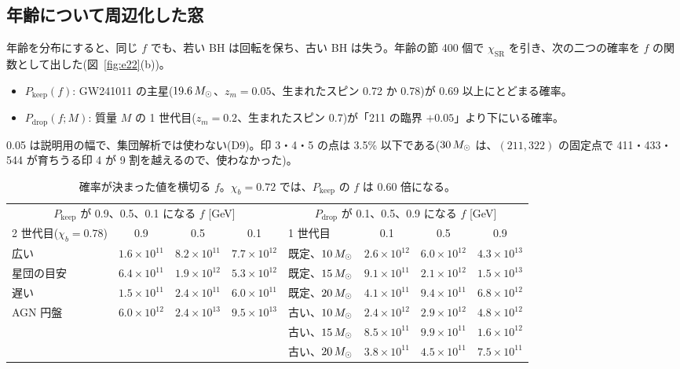 \subsection{年齢について周辺化した窓}

年齢を分布にすると、同じ $f$ でも、若い BH は回転を保ち、古い BH は失う。年齢の節 400 個で $\chi_\mathrm{SR}$ を引き、次の二つの確率を $f$ の関数として出した(図~\ref{fig:e22}(b))。
\begin{itemize}
\item $P_\mathrm{keep}(f)$: GW241011 の主星($19.6\,M_\odot$、$z_m=0.05$、生まれたスピン 0.72 か 0.78)が 0.69 以上にとどまる確率。
\item $P_\mathrm{drop}(f;M)$: 質量 $M$ の 1 世代目($z_m=0.2$、生まれたスピン 0.7)が「211 の臨界 $+0.05$」より下にいる確率。
\end{itemize}
0.05 は説明用の幅で、集団解析では使わない(D9)。印 3・4・5 の点は 3.5\% 以下である($30\,M_\odot$ は、$(211,322)$ の固定点で 411・433・544 が育ちうる印 4 が 9 割を越えるので、使わなかった)。

\begin{table}[H]
\centering\footnotesize
\begin{tabular}{lccc@{\qquad}lccc}
\toprule
\multicolumn{4}{c}{$P_\mathrm{keep}$ が 0.9、0.5、0.1 になる $f$ [GeV]} & \multicolumn{4}{c}{$P_\mathrm{drop}$ が 0.1、0.5、0.9 になる $f$ [GeV]}\\
2 世代目($\chi_b=0.78$) & 0.9 & 0.5 & 0.1 & 1 世代目 & 0.1 & 0.5 & 0.9\\
\midrule
広い & $1.6\times10^{11}$ & $8.2\times10^{11}$ & $7.7\times10^{12}$ & 既定、$10\,M_\odot$ & $2.6\times10^{12}$ & $6.0\times10^{12}$ & $4.3\times10^{13}$\\
星団の目安 & $6.4\times10^{11}$ & $1.9\times10^{12}$ & $5.3\times10^{12}$ & 既定、$15\,M_\odot$ & $9.1\times10^{11}$ & $2.1\times10^{12}$ & $1.5\times10^{13}$\\
遅い & $1.5\times10^{11}$ & $2.4\times10^{11}$ & $6.0\times10^{11}$ & 既定、$20\,M_\odot$ & $4.1\times10^{11}$ & $9.4\times10^{11}$ & $6.8\times10^{12}$\\
AGN 円盤 & $6.0\times10^{12}$ & $2.4\times10^{13}$ & $9.5\times10^{13}$ & 古い、$10\,M_\odot$ & $2.4\times10^{12}$ & $2.9\times10^{12}$ & $4.8\times10^{12}$\\
 & & & & 古い、$15\,M_\odot$ & $8.5\times10^{11}$ & $9.9\times10^{11}$ & $1.6\times10^{12}$\\
 & & & & 古い、$20\,M_\odot$ & $3.8\times10^{11}$ & $4.5\times10^{11}$ & $7.5\times10^{11}$\\
\bottomrule
\end{tabular}
\caption{確率が決まった値を横切る $f$。$\chi_b=0.72$ では、$P_\mathrm{keep}$ の $f$ は 0.60 倍になる。}
\label{tab:e22f}
\end{table}

